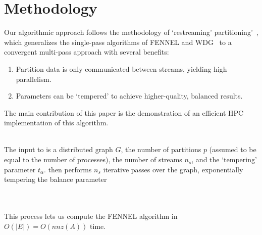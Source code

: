 \section{Methodology}
Our algorithmic approach follows the methodology of `restreaming' partitioning'~\cite{nishimura2013restream}, which generalizes the single-pass algorithms of FENNEL and WDG~\cite{tsourakakis2012fennel,Stanton:2012:SGP:2339530.2339722} to a convergent multi-pass approach with several benefits:

\begin{enumerate}
\item Partition data is only communicated between streams, yielding high parallelism.
\item Parameters can be `tempered' to achieve higher-quality, balanced results.
\end{enumerate}

The main contribution of this paper is the demonstration of an efficient HPC implementation of this algorithm. 

\\
The input to \ourmethod is a distributed graph $G$, the number of partitions $p$ (assumed to be equal to the number of processes), the number of streams $n_s$, and the `tempering' parameter $t_\alpha$. \ourmethod then performs $n_s$ iterative passes over the graph, exponentially tempering the balance parameter

\\


\\


This process lets us compute the FENNEL algorithm in $O(|E|)=O(nnz(A))$ time.